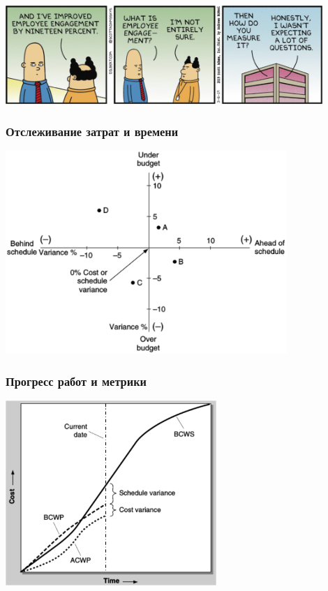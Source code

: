 \documentclass{../../slides-style}
\begin{document}
    \begin{frame}
        \begin{center}
            \includegraphics[width=0.9\textwidth]{dilbertEmployeeEngagement.png}
        \end{center}
    \end{frame}

    \begin{frame}
        \frametitle{Отслеживание затрат и времени}
        \begin{center}
            \includegraphics[width=0.8\textwidth]{varianceGraph.png}
        \end{center}
    \end{frame}

    \begin{frame}
        \frametitle{Прогресс работ и метрики}
        \begin{center}
            \includegraphics[width=0.6\textwidth]{metricsGraph.png}
        \end{center}
    \end{frame}
\end{document}
